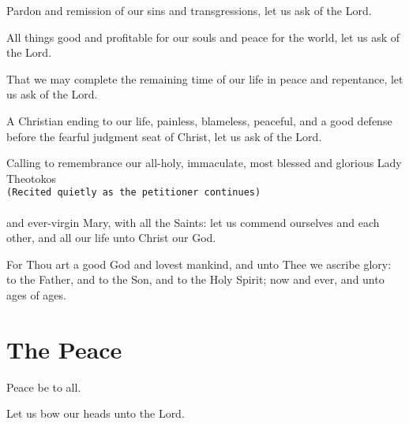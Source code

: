 \documentclass[twoside, letterpaper, 12pt]{report}
\newcommand{\instruction}[1]{%
  \texttt{\scriptsize{#1}}%
}
\newcommand{\centeredsection}[1]{%
  \needspace{10\baselineskip}%
  \section*{\centering{}#1}%
}
\begin{document}
\begin{deacon}
\item Pardon and remission of our sins and transgressions, let us ask of the Lord.
\item All things good and profitable for our souls and peace for the world, let us ask of the Lord.
\item That we may complete the remaining time of our life in peace and repentance, let
    us ask of the Lord.
\item A Christian ending to our life, painless, blameless, peaceful, and a good defense
    before the fearful judgment seat of Christ, let us ask of the Lord.
\item Calling to remembrance our all-holy, immaculate, most blessed and glorious Lady Theotokos\\
    \instruction{(Recited quietly as the petitioner continues)}\\
    \\
    and ever-virgin Mary, with all the Saints: let us commend ourselves and each other,
    and all our life unto Christ our God.
\end{deacon}

\begin{priest}
\item For Thou art a good God and lovest mankind, and unto Thee we ascribe glory:
    to the Father, and to the Son, and to the Holy Spirit; now and ever, and unto ages of ages.
\end{priest}


\centeredsection{The Peace}

\begin{priest}
\item Peace be to all.
\end{priest}

\begin{deacon}
\item Let us bow our heads unto the Lord.
\end{deacon}

\end{document}
